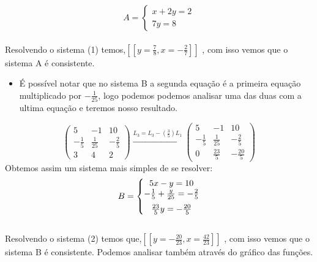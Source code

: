 \documentclass{article}
\begin{document}
      \begin{equation}
      A = \left\{\begin{matrix} x+2y=2\\  7y=8 \end{matrix}\right.
      \end{equation}
      \\
      Resolvendo o sistema (1) temos,$\left [ \left [ y=\frac{7}{8}  , x=-\frac{2}{7}  \right ] \right ]$ , com isso vemos que o sistema A é consistente.
      \begin{itemize}
          \item É possível notar que no sistema B a segunda equação é a primeira equação multiplicado por $ -\frac{1}{25}$, logo podemos podemos analisar uma das duas com a ultima equação e teremos nosso resultado. \bigskip
          
      \end{itemize}
      \begin{equation*}
      \begin{pmatrix} 5 &-1  &10 \\-\frac{1}{5}& \frac{1}{25} & -\frac{2}{5} \\ 3 & 4 & 2 \end{pmatrix}
      \xrightarrow[]{L_3=L_3-(\frac{3}{5})L_1}
      \begin{pmatrix} 5 &-1  &10 \\-\frac{1}{5}& \frac{1}{25} & -\frac{2}{5} \\ 0 & \frac{23}{5} & -\frac{20}{5} \end{pmatrix}
      \end{equation*}
      Obtemos assim um sistema mais simples de se resolver:
      \begin{equation}
        B = \left\{\begin{matrix} 5x - y = 10 \\ \medskip -\frac{1}{5} + \frac{y}{25} = -\frac{2}{5} \\  \frac{23}{5}y= -\frac{20}{5} \end{matrix}\right.
      \end{equation}
       \\ 
       Resolvendo o sistema (2) temos que,$\left [ \left [ y=-\frac{20}{23}  , x=\frac{42}{23}  \right ] \right ]$ , com isso vemos que o sistema B é consistente.
    Podemos analisar também através do gráfico das funções.
    
\end{document}
